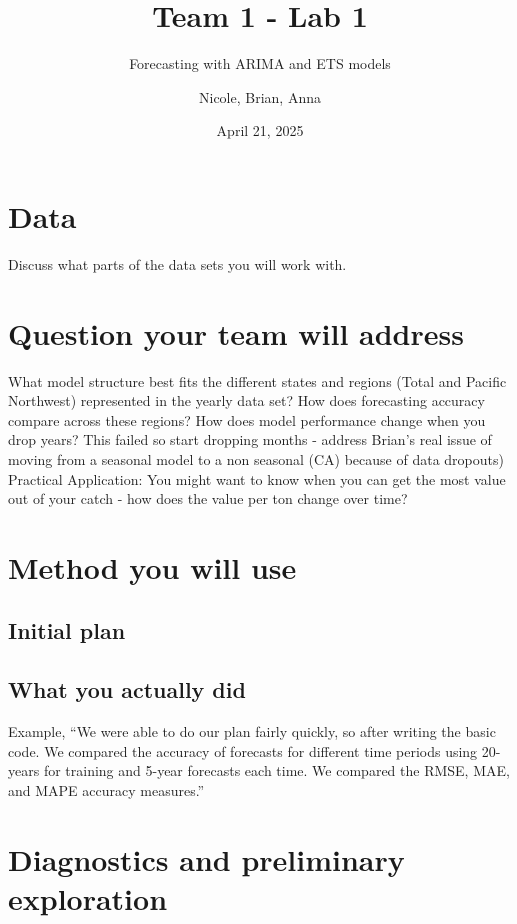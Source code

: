 \documentclass[
]{article}
\title{Team 1 - Lab 1}
\subtitle{Forecasting with ARIMA and ETS models}
\author{Nicole, Brian, Anna}
\date{April 21, 2025}
\begin{document}
\maketitle

{
\setcounter{tocdepth}{2}
\tableofcontents
}
\section{Data}\label{data}

Discuss what parts of the data sets you will work with.

\section{Question your team will
address}\label{question-your-team-will-address}

What model structure best fits the different states and regions (Total
and Pacific Northwest) represented in the yearly data set? How does
forecasting accuracy compare across these regions? How does model
performance change when you drop years? This failed so start dropping
months - address Brian's real issue of moving from a seasonal model to a
non seasonal (CA) because of data dropouts) Practical Application: You
might want to know when you can get the most value out of your catch -
how does the value per ton change over time?

\section{Method you will use}\label{method-you-will-use}

\subsection{Initial plan}\label{initial-plan}

\subsection{What you actually did}\label{what-you-actually-did}

Example, ``We were able to do our plan fairly quickly, so after writing
the basic code. We compared the accuracy of forecasts for different time
periods using 20-years for training and 5-year forecasts each time. We
compared the RMSE, MAE, and MAPE accuracy measures.''

\section{Diagnostics and preliminary
exploration}\label{diagnostics-and-preliminary-exploration}
\end{document}
